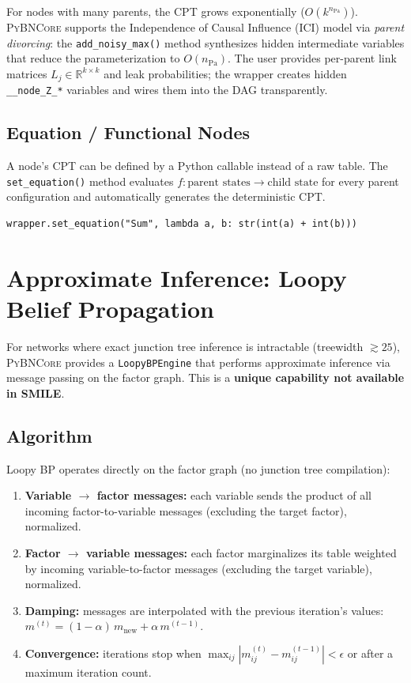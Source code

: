 \documentclass[11pt, letterpaper]{article}
\newcommand{\bncore}{\textsc{PyBNCore}}
\newcommand{\smiletool}{\textsc{SMILE}}
\newcommand{\R}{\mathbb{R}}
\newcommand{\Pa}{\mathrm{Pa}}
\theoremstyle{definitionstyle}
\begin{document}
For nodes with many parents, the CPT grows exponentially ($O(k^{n_{\Pa}})$).
\bncore{} supports the Independence of Causal Influence (ICI) model via
\emph{parent divorcing}: the \texttt{add\_noisy\_max()} method synthesizes
hidden intermediate variables that reduce the parameterization to
$O(n_{\Pa})$. The user provides per-parent link matrices
$L_j \in \R^{k \times k}$ and leak probabilities; the wrapper creates
hidden \texttt{\_\_node\_Z\_*} variables and wires them into the DAG
transparently.

\subsection{Equation / Functional Nodes}

A node's CPT can be defined by a Python callable instead of a raw table.
The \texttt{set\_equation()} method evaluates
$f: \text{parent states} \to \text{child state}$ for every parent
configuration and automatically generates the deterministic CPT.

\begin{lstlisting}[style=pythonstyle, caption={Equation node example}]
wrapper.set_equation("Sum", lambda a, b: str(int(a) + int(b)))
\end{lstlisting}


\section{Approximate Inference: Loopy Belief Propagation}
\label{sec:loopy-bp}

For networks where exact junction tree inference is intractable (treewidth
$\gtrsim 25$), \bncore{} provides a \texttt{LoopyBPEngine} that performs
approximate inference via message passing on the factor graph. This is a
\textbf{unique capability not available in \smiletool{}}.

\subsection{Algorithm}

Loopy BP operates directly on the factor graph (no junction tree compilation):
\begin{enumerate}[nosep]
  \item \textbf{Variable $\to$ factor messages:} each variable sends the
    product of all incoming factor-to-variable messages (excluding the
    target factor), normalized.
  \item \textbf{Factor $\to$ variable messages:} each factor marginalizes
    its table weighted by incoming variable-to-factor messages (excluding
    the target variable), normalized.
  \item \textbf{Damping:} messages are interpolated with the previous
    iteration's values: $m^{(t)} = (1-\alpha)\,m_{\text{new}} + \alpha\,m^{(t-1)}$.
  \item \textbf{Convergence:} iterations stop when
    $\max_{ij}|m_{ij}^{(t)} - m_{ij}^{(t-1)}| < \epsilon$ or after a
    maximum iteration count.
\end{enumerate}
\end{document}
